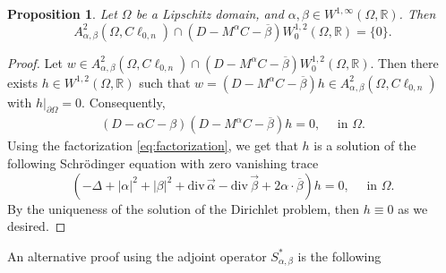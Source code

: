 \documentclass[12pt]{article}
\newcommand{\comment}[1]{\marginpar{\hfuzz=5ex
\scriptsize$\stackrel{?}{\longleftarrow}$\\\hspace*{-3ex}
{\fbox{\parbox{20ex}{\hfuzz=15ex \raggedright\sf#1 }}} }}
\newtheorem{proposition}[theorem]{Proposition}
\def\div{\mbox{div}\,}
\def\C{\mathbb{C}}
\def\D{\mathbb{D}}
\begin{document}
\begin{proposition}\label{prop:empty}
Let $\Omega$ be a Lipschitz domain, and $\alpha, \beta\in W^{1,\infty}(\Omega, \mathbb{R})$. Then
\[
  A_{\alpha,\beta}^2(\Omega,C\ell_{0,n})\cap (D-M^{\alpha}C-\overline{\beta}) W_0^{1,2}(\Omega,\mathbb{R})=\{0\}.
\]
\end{proposition}
\begin{proof}
Let $w\in A_{\alpha,\beta}^2(\Omega,C\ell_{0,n})\cap(D-M^{\alpha}C-\overline{\beta}) W_0^{1,2}(\Omega,\mathbb{R})$. Then there exists $h\in W^{1,2}(\Omega,\mathbb{R})$ such that $w=(D-M^{\alpha}C-\overline{\beta})h\in A_{\alpha,\beta}^2(\Omega,C\ell_{0,n})$ with $h|_{\partial\Omega}=0.$ Consequently, 
\begin{align*}
     (D-\alpha C-\beta)(D-M^{\alpha}C-\overline{\beta})h=0, \quad \text{ in }\Omega.
\end{align*}
Using the factorization \eqref{eq:factorization}, we get that $h$ is a solution of the following Schr\"{o}dinger equation with zero vanishing trace
\[
\left(-\Delta+|\alpha|^2+|\beta|^2+\div \vec \alpha-\div \vec \beta+2\alpha\cdot \overline{\beta}\right)h=0, \quad \text{ in }\Omega.
\]
By the uniqueness of the solution of the Dirichlet problem, then $h\equiv 0$ as we desired.
\end{proof}
An alternative proof using the adjoint operator $S_{\alpha,\beta}^*$ is the following
\end{document}
